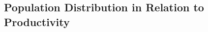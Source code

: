 \documentclass[11pt]{article}
\begin{document}


\subsection{Population Distribution in Relation to Productivity}
\end{document}
